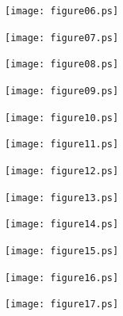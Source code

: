 \documentclass[a4paper]{amsart}
\numberwithin{equation}{section}
\begin{document}
\begin{minipage}{2.9cm} 
\texttt{[image: figure06.ps]}
\end{minipage}
\begin{minipage}{2.9cm}
\texttt{[image: figure07.ps]}
\end{minipage}
\begin{minipage}{2.9cm}
\texttt{[image: figure08.ps]}
\end{minipage}
\begin{minipage}{2.9cm}
\texttt{[image: figure09.ps]}
\end{minipage}
\vfil\eject


\begin{minipage}{2.9cm}
\texttt{[image: figure10.ps]}
\end{minipage}
\begin{minipage}{2.9cm}
\texttt{[image: figure11.ps]}
\end{minipage}
\begin{minipage}{2.9cm}
\texttt{[image: figure12.ps]}
\end{minipage}
\begin{minipage}{2.9cm} 
\texttt{[image: figure13.ps]}
\end{minipage}
\vfil\eject


\begin{minipage}{2.9cm}
\texttt{[image: figure14.ps]}
\end{minipage}
\begin{minipage}{2.9cm}
\texttt{[image: figure15.ps]}
\end{minipage}
\begin{minipage}{2.9cm}
\texttt{[image: figure16.ps]}
\end{minipage}
\begin{minipage}{2.9cm} 
\texttt{[image: figure17.ps]}
\end{minipage}
\vfil\eject
\end{document}
